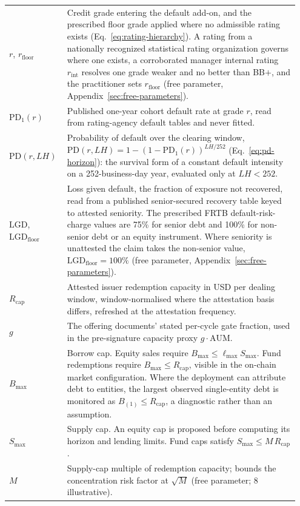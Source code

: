 \begin{longtable}{@{}p{0.18\linewidth} p{0.77\linewidth}@{}}
$r$, $r_{\mathrm{floor}}$ & Credit grade entering the default add-on, and the prescribed floor grade applied where no admissible rating exists (Eq.~\eqref{eq:rating-hierarchy}). A rating from a nationally recognized statistical rating organization governs where one exists, a corroborated manager internal rating $r_{\mathrm{int}}$ resolves one grade weaker and no better than BB$+$, and the practitioner sets $r_{\mathrm{floor}}$ (free parameter, Appendix~\ref{sec:free-parameters}).\\
$\mathrm{PD}_1(r)$ & Published one-year cohort default rate at grade $r$, read from rating-agency default tables and never fitted.\\
$\mathrm{PD}(r,LH)$ & Probability of default over the clearing window, $\mathrm{PD}(r,LH)=1-(1-\mathrm{PD}_1(r))^{LH/252}$ (Eq.~\eqref{eq:pd-horizon}): the survival form of a constant default intensity on a 252-business-day year, evaluated only at $LH<252$.\\
$\mathrm{LGD}$, $\mathrm{LGD}_{\mathrm{floor}}$ & Loss given default, the fraction of exposure not recovered, read from a published senior-secured recovery table keyed to attested seniority. The prescribed FRTB default-risk-charge values are 75\% for senior debt and 100\% for non-senior debt or an equity instrument. Where seniority is unattested the claim takes the non-senior value, $\mathrm{LGD}_{\mathrm{floor}}=100\%$ (free parameter, Appendix~\ref{sec:free-parameters}).\\
$R_{\mathrm{cap}}$ & Attested issuer redemption capacity in USD per dealing window, window-normalised where the attestation basis differs, refreshed at the attestation frequency.\\
$g$ & The offering documents' stated per-cycle gate fraction, used in the pre-signature capacity proxy $g\cdot\mathrm{AUM}$.\\
$B_{\max}$ & Borrow cap. Equity sales require $B_{\max}\le\ell_{\max}S_{\max}$. Fund redemptions require $B_{\max} \le R_{\mathrm{cap}}$, visible in the on-chain market configuration. Where the deployment can attribute debt to entities, the largest observed single-entity debt is monitored as $B_{(1)} \le R_{\mathrm{cap}}$, a diagnostic rather than an assumption.\\
$S_{\max}$ & Supply cap. An equity cap is proposed before computing its horizon and lending limits. Fund caps satisfy $S_{\max} \le M\, R_{\mathrm{cap}}$.\\
$M$ & Supply-cap multiple of redemption capacity; bounds the concentration risk factor at $\sqrt{M}$ (free parameter; $8$ illustrative).\\

\end{longtable}
